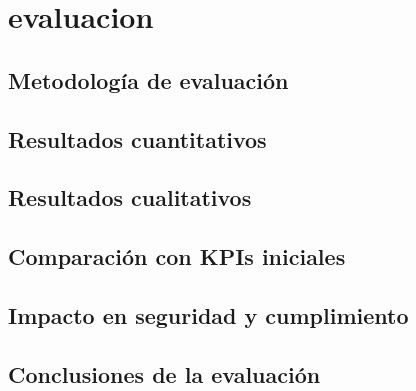 \chapter{evaluacion}
\section{Metodología de evaluación}
\section{Resultados cuantitativos}
\section{Resultados cualitativos}
\section{Comparación con KPIs iniciales}
\section{Impacto en seguridad y cumplimiento}
\section{Conclusiones de la evaluación}